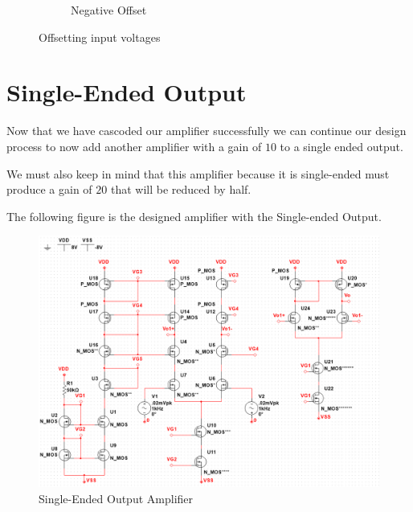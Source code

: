 \documentclass[12pt]{article}
\begin{document}
\begin{figure}
\begin{subfigure}{.5\textwidth}
			\caption{Negative Offset}
			\label{fig:sub2}
		\end{subfigure}
		\caption{Offsetting input voltages}
		\label{fig:test}
	\end{figure}
	
	\newpage
	\section{Single-Ended Output }
	Now that we have cascoded our amplifier successfully we can continue our design process to now add another amplifier with a gain of $10$ to a single ended output.
	
	We must also keep in mind that this amplifier because it is single-ended must produce a gain of $20$ that will be reduced by half.
	
	The following figure is the designed amplifier with the Single-ended Output.
	
	\begin{figure}[h!]
		\label{fig:amp}
		\caption{Single-Ended Output Amplifier}
		\centering
		\includegraphics[width=1\textwidth]{fullstage2}
	\end{figure}
	
\end{document}
